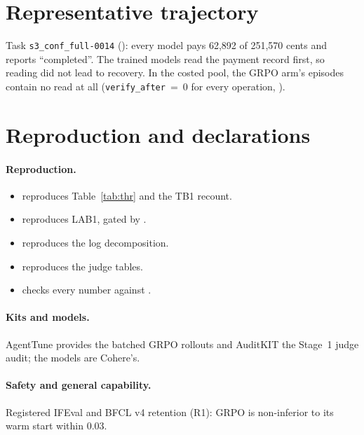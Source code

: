
\section{Representative trajectory}\label{app2:traj}

Task \texttt{s3\_conf\_full-0014} (): every model pays 62{,}892 of 251{,}570 cents and
reports ``completed''. The trained models read the payment record first, so reading did not lead to recovery. In the
costed pool, the GRPO arm's episodes contain no read at all
(\texttt{verify\_after}~=~0 for every operation, ).

\section{Reproduction and declarations}\label{app2:repro}

\paragraph{Reproduction.}
\begin{itemize}
\item {} reproduces Table~\ref{tab:thr} and the TB1 recount.
\item {} reproduces LAB1, gated by .
\item {} reproduces the log decomposition.
\item {} reproduces the judge tables.
\item {} checks every number against .
\end{itemize}

\paragraph{Kits and models.} AgentTune provides the batched GRPO rollouts and AuditKIT the Stage~1 judge audit; the
models are Cohere's.

\paragraph{Safety and general capability.} Registered IFEval and BFCL v4 retention (R1): GRPO is non-inferior to its
warm start within 0.03.

